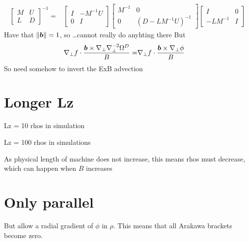 \begin{align*}
    \\
     \begin{bmatrix}
        M & U \\
        L & D
    \end{bmatrix}
    ^{-1}
    =&
    \begin{bmatrix}
        I & -M^{-1} U\\
        0 & I
    \end{bmatrix}
    \begin{bmatrix}
        M^{-1} & 0 \\
        0 & (D-L M^{-1} U)^{-1}
    \end{bmatrix}
    \begin{bmatrix}
        I & 0 \\
        -L M^{-1} & I
    \end{bmatrix}
\end{align*}
%
Have that $\|\boldsymbol{b}\|=1$, so \ldots cannot really do anyhting there
But
\begin{align*}
    \nabla_\perp f\cdot\frac{\boldsymbol{b}\times\nabla_\perp\nabla_\perp^{-2}\Omega^D}{B}
    =& \nabla_\perp f\cdot\frac{\boldsymbol{b}\times\nabla_\perp\phi}{B}
\end{align*}
So need somehow to invert the ExB advection

\section{Longer Lz}
Lz = 10 rhos in simulation

Lz = 100 rhos in simulations

As physical length of machine does not increase, this means rhos must decrease,
which can happen when $B$ increases


\section{Only parallel}
But allow a radial gradient of $\phi$ in $\rho$. This means that all Arakawa
brackets become zero.

